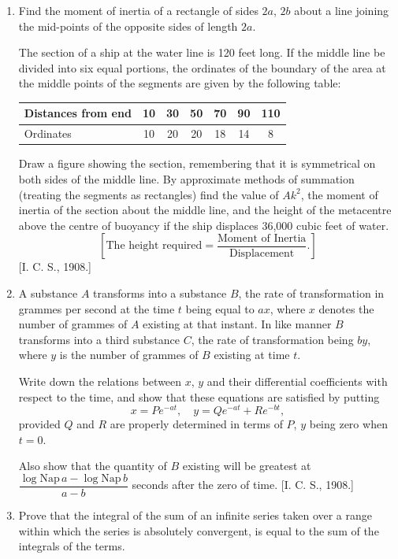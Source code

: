 \documentclass[11pt, a4paper]{article}
\newcommand{\source}[1]{\hfill\textnormal{[#1]}}
\begin{document}
\begin{enumerate}[leftmargin=2em]
\item Find the moment of inertia of a rectangle of sides $2a$, $2b$ about a line joining the mid-points of the opposite sides of length $2a$.

The section of a ship at the water line is 120 feet long. If the middle line be divided into six equal portions, the ordinates of the boundary of the area at the middle points of the segments are given by the following table:

\begin{center}
\begin{tabular}{@{}l|cccccc@{}}
\toprule
Distances from end & 10 & 30 & 50 & 70 & 90 & 110 \\
\midrule
Ordinates & 10 & 20 & 20 & 18 & 14 & 8 \\
\bottomrule
\end{tabular}
\end{center}

Draw a figure showing the section, remembering that it is symmetrical on both sides of the middle line. By approximate methods of summation (treating the segments as rectangles) find the value of $Ak^2$, the moment of inertia of the section about the middle line, and the height of the metacentre above the centre of buoyancy if the ship displaces 36,000 cubic feet of water.
\[
\left[\text{The height required} = \dfrac{\text{Moment of Inertia}}{\text{Displacement}}.\right]
\]
\source{I. C. S., 1908.}

\item A substance $A$ transforms into a substance $B$, the rate of transformation in grammes per second at the time $t$ being equal to $ax$, where $x$ denotes the number of grammes of $A$ existing at that instant. In like manner $B$ transforms into a third substance $C$, the rate of transformation being $by$, where $y$ is the number of grammes of $B$ existing at time $t$.

Write down the relations between $x$, $y$ and their differential coefficients with respect to the time, and show that these equations are satisfied by putting
\[
x=Pe^{-at}, \quad y=Qe^{-at}+Re^{-bt},
\]
provided $Q$ and $R$ are properly determined in terms of $P$, $y$ being zero when $t=0$.

Also show that the quantity of $B$ existing will be greatest at
$\dfrac{\log\text{Nap}\,a - \log\text{Nap}\,b}{a-b}$ seconds after the zero of time. \source{I. C. S., 1908.}

\item Prove that the integral of the sum of an infinite series taken over a range within which the series is absolutely convergent, is equal to the sum of the integrals of the terms.


\end{enumerate}
\end{document}
